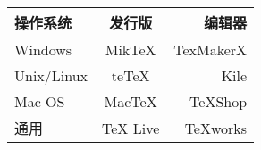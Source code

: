 \begin{tabular}{|l|c|r|}
    \hline
    操作系统 & 发行版 & 编辑器 \\
    \hline
    Windows     & MikTeX    & TexMakerX \\
    \hline
    Unix/Linux  & teTeX     & Kile \\
    \hline
    Mac OS      & MacTeX    & TeXShop \\
    \hline
    通用        & TeX Live  & TeXworks \\
    \hline
\end{tabular}

